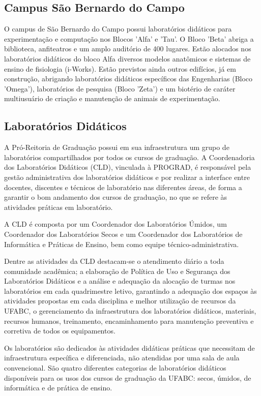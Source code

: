 \documentclass{article}
\begin{document}
\subsection{Campus São Bernardo do Campo} 

O campus de São Bernardo do Campo possui laboratórios didáticos para experimentação e computação nos Blocos 'Alfa' e 'Tau'. O Bloco 'Beta' abriga a biblioteca, anfiteatros e um amplo auditório de 400 lugares. Estão alocados nos laboratórios didáticos do bloco Alfa diversos modelos anatômicos e sistemas de ensino de fisiologia (i-Works). Estão previstos ainda outros edifícios, já em construção, abrigando laboratórios didáticos específicos das Engenharias (Bloco 'Omega'), laboratórios de pesquisa (Bloco 'Zeta') e um biotério de caráter multiusuário de criação e manutenção de animais de experimentação.

\subsection{Laboratórios Didáticos}
A Pró-Reitoria de Graduação possui em sua infraestrutura um grupo de laboratórios compartilhados por todos os cursos de graduação. A Coordenadoria dos Laboratórios Didáticos (CLD), vinculada à PROGRAD, é responsável pela gestão administrativa dos laboratórios didáticos e por realizar a interface entre docentes, discentes e técnicos de laboratório nas diferentes áreas, de forma a garantir o bom andamento dos cursos de graduação, no que se refere às atividades práticas em laboratório.

A CLD é composta por um Coordenador dos Laboratórios Úmidos, um Coordenador dos Laboratórios Secos e um Coordenador dos Laboratórios de Informática e Práticas de Ensino, bem como equipe técnico-administrativa. 

Dentre as atividades da CLD destacam-se o atendimento diário a toda comunidade acadêmica; a elaboração de Política de Uso e Segurança dos Laboratórios Didáticos e a análise e adequação da alocação de turmas nos laboratórios em cada quadrimestre letivo, garantindo a adequação dos espaços às atividades propostas em cada disciplina e melhor utilização de recursos da UFABC, o gerenciamento da infraestrutura dos laboratórios didáticos, materiais, recursos humanos, treinamento, encaminhamento para manutenção preventiva e corretiva de todos os equipamentos. 

Os laboratórios são dedicados às atividades didáticas práticas que necessitam de infraestrutura específica e diferenciada, não atendidas por uma sala de aula convencional. São quatro diferentes categorias de laboratórios didáticos disponíveis para os usos dos cursos de graduação da UFABC: secos, úmidos, de informática e de prática de ensino.
\end{document}
